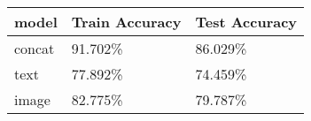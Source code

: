 \begin{tabular}{lll}
\toprule
 model & Train Accuracy & Test Accuracy \\
\midrule
concat &        91.702\% &       86.029\% \\
  text &        77.892\% &       74.459\% \\
 image &        82.775\% &       79.787\% \\
\bottomrule
\end{tabular}
